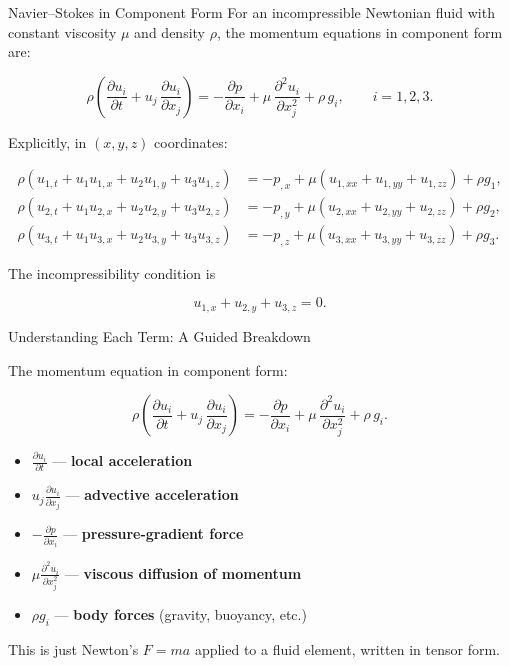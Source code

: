 \documentclass[aspectratio=169]{beamer}
\begin{document}
\begin{frame}{Navier--Stokes in Component Form}
\footnotesize
For an incompressible Newtonian fluid with constant viscosity $\mu$ and density $\rho$,
the momentum equations in component form are:

\[
\rho\left(
\frac{\partial u_i}{\partial t}
+ u_j\,\frac{\partial u_i}{\partial x_j}
\right)
=
-\frac{\partial p}{\partial x_i}
+ \mu\,\frac{\partial^2 u_i}{\partial x_j^2}
+ \rho\,g_i,
\qquad i = 1,2,3.
\]

\medskip

Explicitly, in $(x,y,z)$ coordinates:

\[
\begin{aligned}
\rho\left(u_{1,t} + u_1 u_{1,x} + u_2 u_{1,y} + u_3 u_{1,z}\right)
&= -p_{,x} + \mu\left(u_{1,xx}+u_{1,yy}+u_{1,zz}\right) + \rho g_1,\\[4pt]
\rho\left(u_{2,t} + u_1 u_{2,x} + u_2 u_{2,y} + u_3 u_{2,z}\right)
&= -p_{,y} + \mu\left(u_{2,xx}+u_{2,yy}+u_{2,zz}\right) + \rho g_2,\\[4pt]
\rho\left(u_{3,t} + u_1 u_{3,x} + u_2 u_{3,y} + u_3 u_{3,z}\right)
&= -p_{,z} + \mu\left(u_{3,xx}+u_{3,yy}+u_{3,zz}\right) + \rho g_3.
\end{aligned}
\]

The incompressibility condition is

\[
u_{1,x} + u_{2,y} + u_{3,z} = 0.
\]

\end{frame}

\begin{frame}{Understanding Each Term: A Guided Breakdown}

The momentum equation in component form:

\[
\rho\left(
\frac{\partial u_i}{\partial t}
+ u_j\,\frac{\partial u_i}{\partial x_j}
\right)
=
-\frac{\partial p}{\partial x_i}
+ \mu\,\frac{\partial^2 u_i}{\partial x_j^2}
+ \rho\,g_i.
\]

\begin{itemize}
\item $\displaystyle \frac{\partial u_i}{\partial t}$ — \textbf{local acceleration}
\item $\displaystyle u_j \frac{\partial u_i}{\partial x_j}$ — \textbf{advective acceleration}
\item $\displaystyle -\frac{\partial p}{\partial x_i}$ — \textbf{pressure-gradient force}
\item $\displaystyle \mu \frac{\partial^2 u_i}{\partial x_j^2}$ — \textbf{viscous diffusion of momentum}
\item $\rho g_i$ — \textbf{body forces} (gravity, buoyancy, etc.)
\end{itemize}

\medskip

This is just Newton’s $F=ma$ applied to a fluid element, written in tensor form.

\end{frame}
\end{document}
